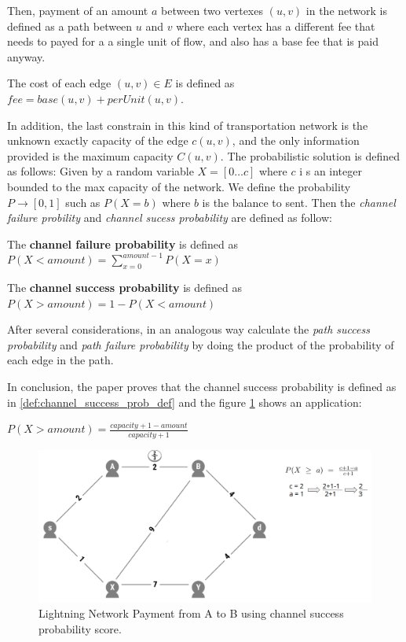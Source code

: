 Then, payment of an amount $a$ between two vertexes $(u, v)$ in the network is defined 
as a path between $u$ and $v$ where each vertex has a different fee that needs to payed for a 
a single unit of flow, and also has a base fee that is paid anyway.

\begin{definition}
    The cost of each edge $(u, v) \in E$ is defined as $fee = base(u, v) + perUnit(u, v)$.
\end{definition}

In addition, the last constrain in this kind of transportation network is the 
unknown exactly capacity of the edge $c(u, v)$, and the only information provided 
is the maximum capacity $C(u, v)$.
The probabilistic solution is defined as follows: Given by a random variable $X = [0 \dots c]$ where $c$ i
s an integer bounded to the max capacity of the network. We define the probability 
$P \rightarrow [0, 1]$ such as $P(X = b)$ where $b$ is the balance to sent.
Then the \emph{channel failure probility} and \emph{channel sucess probability} are defined as follow:

\begin{definition}
   The {\bf channel failure probability} is defined as $P(X < amount) = \sum_{x = 0}^{amount - 1} P(X = x)$ 
\end{definition}

\begin{definition}
    The {\bf channel success probability} is defined as $P(X > amount) = 1 -  P(X < amount)$
\end{definition}

After several considerations, in an analogous way calculate the \emph{path success probability} and
\emph{path failure probability} by doing the product of the probability of each edge in the path.

In conclusion, the paper proves that the channel success probability is defined as in 
\ref{def:channel_success_prob_def} and the figure \ref{fig:channel_success_prob_score}
shows an application: 

\begin{definition}
\label{def:channel_success_prob_def}
    $P(X > amount) = \frac{capacity + 1 - amount}{capacity + 1}$
\end{definition}


\begin{figure}[h]
  \begin{center}
  \includegraphics[width=0.6\columnwidth]{imgs/mincost_rene1.png}
  \end{center}
  \caption{Lightning Network Payment from A to B using channel success probability score.} 
  \label{fig:channel_success_prob_score}
\end{figure}


